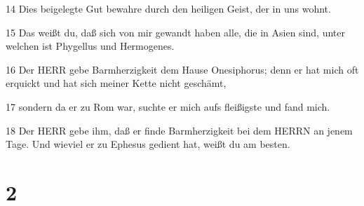 \par 14 Dies beigelegte Gut bewahre durch den heiligen Geist, der in uns wohnt.
\par 15 Das weißt du, daß sich von mir gewandt haben alle, die in Asien sind, unter welchen ist Phygellus und Hermogenes.
\par 16 Der HERR gebe Barmherzigkeit dem Hause Onesiphorus; denn er hat mich oft erquickt und hat sich meiner Kette nicht geschämt,
\par 17 sondern da er zu Rom war, suchte er mich aufs fleißigste und fand mich.
\par 18 Der HERR gebe ihm, daß er finde Barmherzigkeit bei dem HERRN an jenem Tage. Und wieviel er zu Ephesus gedient hat, weißt du am besten.

\chapter{2}

